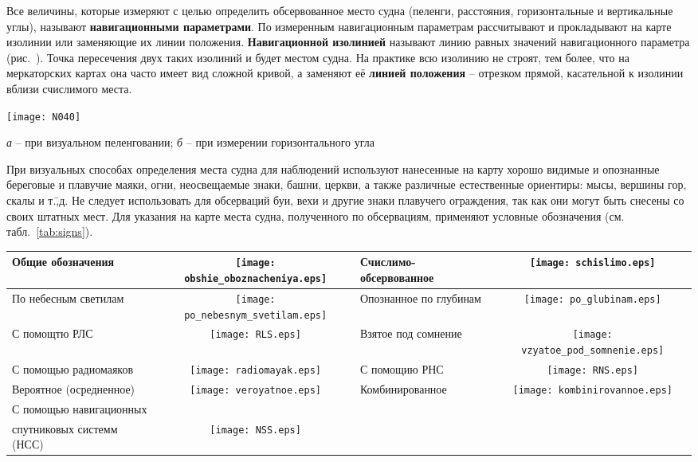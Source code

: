 Все величины, которые измеряют с целью определить обсервованное место судна (пеленги, расстояния, горизонтальные и вертикальные углы), называют \textbf{навигационными параметрами}. По измеренным навигационным параметрам рассчитывают и прокладывают на карте изолинии или заменяющие их линии положения. \textbf{Навигационной изолинией} называют линию равных значений навигационного параметра (рис.~). Точка пересечения двух таких изолиний и будет местом судна. На практике всю изолинию не строят, тем более, что на меркаторских картах она часто имеет вид сложной кривой, а заменяют её \textbf{линией положения} \--- отрезком прямой, касательной к изолинии вблизи счислимого места. 

\begin{figure*}[htb]
  \centering{}
  \texttt{[image: N040]}
  \caption{Изолинии}
  \label{fig:N40}
  \small
  \centering{}
  \textit{а} \--- при визуальном пеленговании; \textit{б} \--- при измерении горизонтального угла
\end{figure*}

При визуальных способах определения места судна для наблюдений используют нанесенные на карту хорошо видимые и опознанные береговые и плавучие маяки, огни, неосвещаемые знаки, башни, церкви, а также различные естественные ориентиры: мысы, вершины гор, скалы и т.\=,д. Не следует использовать для обсерваций буи, вехи и другие знаки плавучего ограждения, так как они могут быть снесены со своих штатных мест. Для указания на карте места судна, полученного по обсервациям, применяют условные обозначения (см. табл.~\ref{tab:signs}).

\begin{table*}[htb]
  \centering{}
  \begin{tabular}[c]{l|c||l|c}
    \toprule
    Общие обозначения & \texttt{[image: obshie\_oboznacheniya.eps]} & 
    Счислимо-обсервованное & \texttt{[image: schislimo.eps]} \\
    \midrule
    По небесным светилам & \texttt{[image: po\_nebesnym\_svetilam.eps]} & 
    Опознанное по глубинам & \texttt{[image: po\_glubinam.eps]} \\
    \midrule
    С помощтю РЛС & \texttt{[image: RLS.eps]} & 
    Взятое под сомнение & \texttt{[image: vzyatoe\_pod\_somnenie.eps]} \\
    \midrule
    С помощью радиомаяков & \texttt{[image: radiomayak.eps]} & 
    С помощию РНС & \texttt{[image: RNS.eps]} \\
    \midrule
    Вероятное (осредненное) & \texttt{[image: veroyatnoe.eps]} & 
    Комбинированное & \texttt{[image: kombinirovannoe.eps]}\\
    \midrule
    С помощью навигационных & \\
    спутниковых системм (НСС) & \texttt{[image: NSS.eps]} \\
    \bottomrule
  \end{tabular}
  \caption{Условные обозначения мест, полученных при обсервации}
  \label{tab:signs}
\end{table*}


